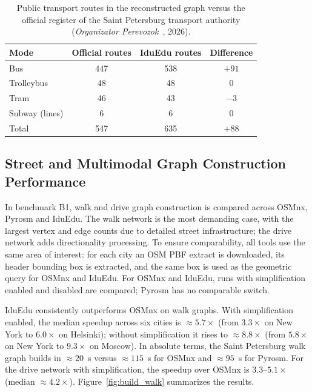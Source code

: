 \documentclass[smartcities,article,submit,moreauthors]{Definitions/mdpi}
\begin{document}
    \begin{table}[H]
        \caption{Public transport routes in the reconstructed graph versus the official register of the
        Saint Petersburg transport authority (\emph{Organizator Perevozok}~\cite{orgp_spb},
            2026).\label{tab:pt_validity}}
        \begin{tabularx}{\textwidth}{lCCC}
            \toprule
            \textbf{Mode}  & \textbf{Official routes} & \textbf{IduEdu routes} & \textbf{Difference} \\
            \midrule
            Bus            & 447                      & 538                    & $+91$               \\
            Trolleybus     & 48                       & 48                     & $0$                 \\
            Tram           & 46                       & 43                     & $-3$                \\
            Subway (lines) & 6                        & 6                      & $0$                 \\
            \midrule
            Total          & 547                      & 635                    & $+88$               \\
            \bottomrule
        \end{tabularx}
    \end{table}

    \subsection{Street and Multimodal Graph Construction Performance}
    \label{subsec:res-build}

    In benchmark B1, walk and drive graph construction is compared across OSMnx, Pyrosm and
    IduEdu.
    The walk network is the most demanding case, with the largest vertex and edge counts due to
    detailed street infrastructure; the drive network adds directionality processing.
    To ensure comparability, all tools use the same area of interest: for each city an OSM PBF extract
    is downloaded, its header bounding box is extracted, and the same box is used as the geometric query
    for OSMnx and IduEdu.
    For OSMnx and IduEdu, runs with simplification enabled and disabled are compared; Pyrosm has no
    comparable switch.

    IduEdu consistently outperforms OSMnx on walk graphs.
    With simplification enabled, the median speedup across six cities is ${\approx}5.7\times$ (from
    $3.3\times$ on New York to $6.0\times$ on Helsinki); without simplification it rises to
    ${\approx}8.8\times$ (from $5.8\times$ on New York to $9.3\times$ on Moscow).
    In absolute terms, the Saint Petersburg walk graph builds in ${\approx}20$~s versus
    ${\approx}115$~s for OSMnx and ${\approx}95$~s for Pyrosm.
    For the drive network with simplification, the speedup over OSMnx is $3.3$--$5.1\times$ (median
    ${\approx}4.2\times$).
    Figure~\ref{fig:build_walk} summarizes the results.
\end{document}
